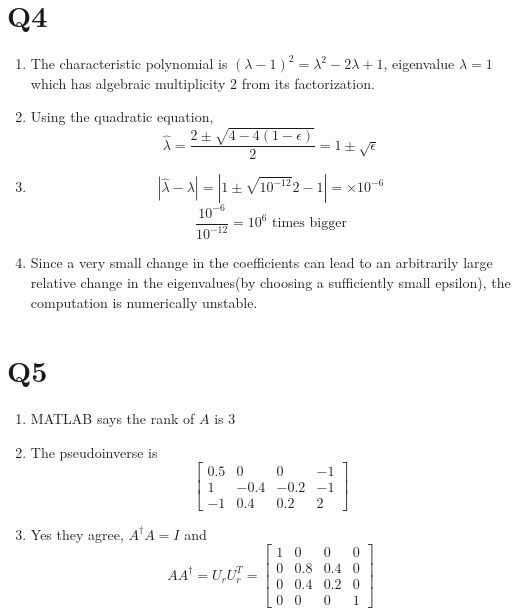 \documentclass{article}
\begin{document}
\section*{Q4}
\begin{enumerate}
    \item The characteristic polynomial is $(\lambda - 1)^2 = \lambda^2 - 2\lambda + 1$,
    eigenvalue $\lambda = 1$ which has algebraic multiplicity 2
    from its factorization.
    \item Using the quadratic equation,
    \[
        \hat{\lambda} = \frac{2 \pm \sqrt{4 - 4(1-\epsilon)}}{2} = 1 \pm \sqrt{\epsilon}
    \]
    \item 
    \[
        |\hat{\lambda} -\lambda|=  |1 \pm\sqrt{10^{-12}}{2} - 1| = \times 10^{-6}
    \]
    \[
        \frac{10^{-6}}{10^{-12}} = 10^6 \text{ times bigger}
    \]
    \item Since a very small change in the coefficients can lead to an arbitrarily
    large relative change in the eigenvalues(by choosing a sufficiently small epsilon),
    the computation is numerically unstable.
\end{enumerate}
\newpage 
\section*{Q5}
\begin{enumerate}
    \item MATLAB says the rank of $A$ is 3
    \item The pseudoinverse is 
    \[  
        \begin{bmatrix}
            0.5 & 0 & 0 & -1 \\
            1 & -0.4 & -0.2 & -1 \\
            -1 & 0.4 & 0.2 & 2
        \end{bmatrix}
    \]
    \item Yes they agree, $A^\dagger A = I$ and 
    \[
        AA^\dagger = U_rU_r^T = \begin{bmatrix}
            1 & 0 & 0 & 0 \\
            0 & 0.8 & 0.4 & 0 \\
            0 & 0.4 & 0.2 & 0 \\
            0 & 0 & 0 & 1
        \end{bmatrix}
    \]
\end{enumerate}
\end{document}
